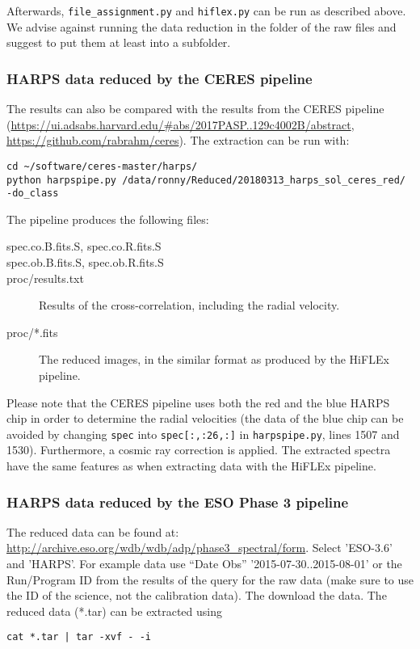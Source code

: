 \documentclass[10pt,a4paper]{article}
\begin{document}
\noindent Afterwards, \verb|file_assignment.py| and \verb|hiflex.py| can be run as described above. We advise against running the data reduction in the folder of the raw files and suggest to put them at least into a subfolder.

\subsubsection{HARPS data reduced by the CERES pipeline}
The results can also be compared with the results from the CERES pipeline (\url{https://ui.adsabs.harvard.edu/#abs/2017PASP..129c4002B/abstract}, \url{https://github.com/rabrahm/ceres}). The extraction can be run with:
\begin{lstlisting}[style=base]
cd ~/software/ceres-master/harps/
python harpspipe.py /data/ronny/Reduced/20180313_harps_sol_ceres_red/ -do_class
\end{lstlisting}

The pipeline produces the following files:
\begin{description}
  \item[spec.co.B.fits.S, spec.co.R.fits.S] 
  \item[spec.ob.B.fits.S, spec.ob.R.fits.S] 
  \item[proc/results.txt] Results of the cross-correlation, including the radial velocity.
  \item[proc/*.fits] The reduced images, in the similar format as produced by the HiFLEx pipeline.
\end{description}

Please note that the CERES pipeline uses both the red and the blue HARPS chip in order to determine the radial velocities (the data of the blue chip can be avoided by changing \verb|spec| into \verb|spec[:,:26,:]| in \verb|harpspipe.py|, lines 1507 and 1530). Furthermore, a cosmic ray correction is applied. The extracted spectra have the same features as when extracting data with the HiFLEx pipeline.


\subsubsection{HARPS data reduced by the ESO Phase 3 pipeline}
The reduced data can be found at: \url{http://archive.eso.org/wdb/wdb/adp/phase3_spectral/form}. Select 'ESO-3.6' and 'HARPS'. For example data use ``Date Obs'' '2015-07-30..2015-08-01' or the Run/Program ID from the results of the query for the raw data (make sure to use the ID of the science, not the calibration data). The download the data. The reduced data (*.tar) can be extracted using
\begin{lstlisting}[style=base]
cat *.tar | tar -xvf - -i
\end{lstlisting}
\end{document}
